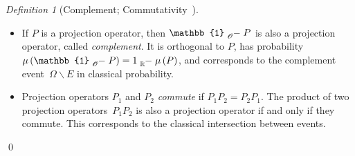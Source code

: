 \documentclass{article}
\theoremstyle{remark}
\newtheorem{definition}{Definition}
\newcommand{\yutsung}[1]{\fbox{\begin{minipage}{0.9\textwidth}\color{purple}{Yu-Tsung says: #1}\end{minipage}}}
\begin{document}
\begin{definition}[Complement; Commutativity~\cite{peres1995quantum,Griffiths2003}]~
\begin{itemize}
\item If $P$ is a projection operator, then $\mathbb{1}\tensor*[_{\mathscr{O}}]{-}{}P$
is also a projection operator, called \emph{complement}. It is orthogonal to $P$, has
probability~$\mu\left(\mathbb{1}\tensor*[_{\mathscr{O}}]{-}{}P\right)=1\tensor*[_{\mathbb{R}}]{-}{}\mu\left(P\right)$, 
and corresponds to the complement event~$\Omega\backslash E$
in classical probability.
\item Projection operators $P_{1}$ and $P_{2}$ \emph{commute} if $P_{1}P_{2}=P_{2}P_{1}$.
The product of two projection operators~$P_{1}P_{2}$ is also a projection
operator if and only if they commute. This corresponds to the classical intersection
between events. 
\end{itemize}
\qed\end{definition}
\end{document}
